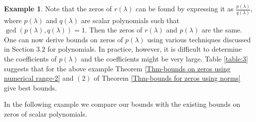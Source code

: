 \documentclass[12pt, reqno]{amsart}
\theoremstyle{definition}
\newtheorem{example}[theorem]{Example}
\theoremstyle{remark}
\numberwithin{equation}{section}
\begin{document}
\begin{example}
Note that the zeros of $r(\lambda)$ can be found by expressing it as
$\displaystyle \frac{p(\lambda)}{q(\lambda)}$, 
where $p(\lambda)$ and $q(\lambda)$ are scalar polynomials such that $\gcd(p(\lambda), 
q(\lambda))=1$. Then the zeros of $r(\lambda)$ and $p(\lambda)$ are the same. One 
can now derive bounds on zeros of $p(\lambda)$ using various techniques discussed 
in Section $3.2$ for polynomials. In practice, however, it is difficult to determine 
the coefficients of $p(\lambda)$ and the coefficients might be very large. Table 
\ref{table:3} suggests that for the above example Theorem 
\ref{Thm-bounds on zeros using numerical range-2} and $(2)$ of Theorem 
\ref{Thm-bounds for zeros using norms} give best bounds.

\end{example}

\noindent
In the following example we compare our bounds with the existing bounds 
on zeros of scalar polynomials.
\end{document}
